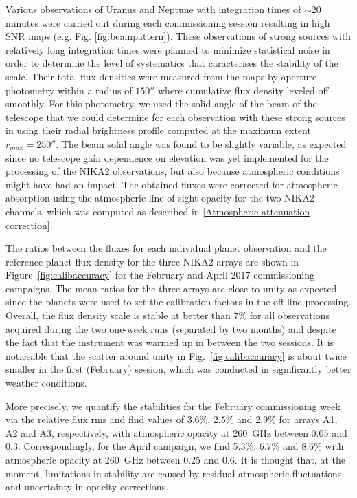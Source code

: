 \documentclass[]{aa} %
\begin{document}
Various observations of Uranus and Neptune with integration times of $\sim 20$ minutes were carried out during each commissioning session resulting in high SNR maps (e.g. Fig. \ref{fig:beampattern}). These observations of strong sources with relatively long integration times were planned to minimize statistical noise in order to determine the level of systematics that caracterises the stability of the scale. Their total flux densities were measured from the maps by aperture photometry within a radius of $150''$ where cumulative flux density leveled off smoothly. For this photometry, we used  the solid angle of the beam of the telescope that we could determine for each observation with these strong sources  in using their radial brightness profile computed at the maximum extent $r_{max}=250''$. The beam solid angle  was found to be slightly variable, as expected since no telescope gain dependence on elevation was yet implemented for the processing of the NIKA2 observations, but also because atmospheric conditions might have had an impact. The obtained fluxes were corrected for atmospheric absorption using the atmospheric line-of-sight opacity for the two NIKA2 channels, which was computed as described in \ref{Atmospheric attenuation correction}.

The ratios between the fluxes for each individual planet observation and the reference planet flux density for the three NIKA2 arrays are shown in Figure~\ref{fig:calibaccuracy} for the February and April 2017 commissioning campaigns.  The mean ratios for the three arrays are close to unity as expected since the planets were used to set the calibration factors in the off-line processing. Overall, the flux density scale is stable at better than $7\%$ for all observations acquired during the two one-week runs (separated by two months) and despite the fact that the instrument was warmed up in between the two sessions. It is noticeable that the scatter around unity in Fig.~\ref{fig:calibaccuracy} is about twice smaller in the first (February) session, which was conducted in significantly better weather conditions.%

More precisely, we quantify the stabilities for the February commissioning week via the relative flux rms and find values of 3.6\%, 2.5\% and 2.9\% for arrays A1, A2 and A3, respectively, with atmospheric opacity at 260~GHz between 0.05 and 0.3. Correspondingly, for the April campaign, we find 5.3\%, 6.7\% and 8.6\%  with atmospheric opacity at 260~GHz between 0.25 and 0.6. It is thought that, at the moment, limitations in stability are caused by residual atmospheric fluctuations and uncertainty in opacity corrections.%
\end{document}
